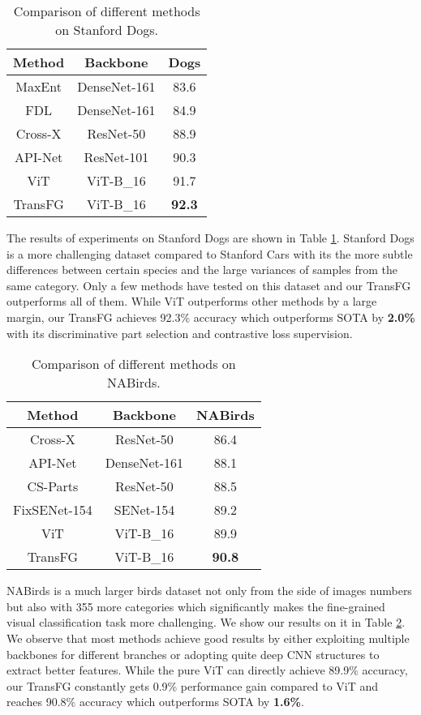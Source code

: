 \begin{table}[]
    \small
    \centering
    \caption{Comparison of different methods on Stanford Dogs.}
    \label{tab:dog}
    \begin{tabular}{c|c|c}
    \hline
    Method & Backbone & Dogs \\ \hline
    MaxEnt & DenseNet-161 & 83.6 \\ 
    FDL & DenseNet-161 & 84.9 \\
    Cross-X & ResNet-50 & 88.9 \\
    API-Net & ResNet-101 & 90.3 \\ \hline
    ViT & ViT-B\_16 & 91.7 \\ 
    TransFG & ViT-B\_16 & \textbf{92.3} \\ \hline
    \end{tabular}
\end{table}

The results of experiments on Stanford Dogs are shown in Table \ref{tab:dog}. Stanford Dogs is a more challenging dataset compared to Stanford Cars with its the more subtle differences between certain species and the large variances of samples from the same category. Only a few methods have tested on this dataset and our TransFG outperforms all of them. While ViT \cite{dosovitskiy2020image} outperforms other methods by a large margin, our TransFG achieves 92.3\% accuracy which outperforms SOTA by \textbf{2.0\%} with its discriminative part selection and contrastive loss supervision.

\begin{table}[]
    \small
    \centering
    \caption{Comparison of different methods on NABirds.}
    \label{tab:na}
    \begin{tabular}{c|c|c}
    \hline
    Method & Backbone & NABirds \\ \hline
    Cross-X & ResNet-50 & 86.4 \\ 
    API-Net & DenseNet-161 & 88.1 \\ 
    CS-Parts & ResNet-50 & 88.5 \\ 
    FixSENet-154 & SENet-154 & 89.2 \\ \hline
    ViT & ViT-B\_16 & 89.9 \\
    TransFG & ViT-B\_16 & \textbf{90.8} \\ \hline
    \end{tabular}
\end{table}

NABirds is a much larger birds dataset not only from the side of images numbers but also with 355 more categories which significantly makes the fine-grained visual classification task more challenging. We show our results on it in Table \ref{tab:na}. 
We observe that most methods achieve good results by either exploiting multiple backbones for different branches or adopting quite deep CNN structures to extract better features. 
While the pure ViT \cite{dosovitskiy2020image} can directly achieve 89.9\% accuracy, our TransFG constantly gets 0.9\% performance gain compared to ViT and reaches 90.8\% accuracy which outperforms SOTA by \textbf{1.6\%}.

